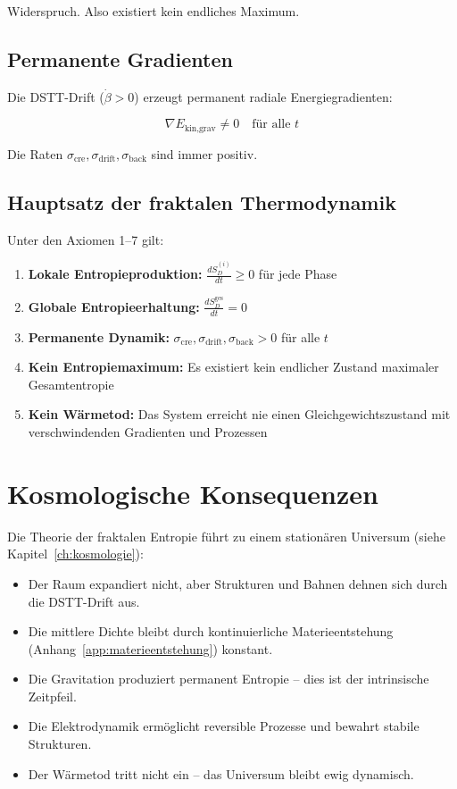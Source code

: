 Widerspruch. Also existiert kein endliches Maximum.

\subsection{Permanente Gradienten}
\label{sub:fraktale_entropie_gradienten}

Die DSTT-Drift (\( \dot{\beta} > 0 \)) erzeugt permanent radiale Energiegradienten:

\[
\nabla E_{\text{kin,grav}} \neq 0 \quad \text{für alle } t \tag{L.18}
\]

Die Raten \( \sigma_{\text{cre}}, \sigma_{\text{drift}}, \sigma_{\text{back}} \) sind immer positiv.

\subsection{Hauptsatz der fraktalen Thermodynamik}
\label{sub:fraktale_entropie_hauptsatz}

Unter den Axiomen 1–7 gilt:

\begin{enumerate}
    \item \textbf{Lokale Entropieproduktion:} \( \displaystyle \frac{dS_D^{(i)}}{dt} \geq 0 \) für jede Phase
    \item \textbf{Globale Entropieerhaltung:} \( \displaystyle \frac{dS_D^{\text{ges}}}{dt} = 0 \)
    \item \textbf{Permanente Dynamik:} \( \sigma_{\text{cre}}, \sigma_{\text{drift}}, \sigma_{\text{back}} > 0 \) für alle \( t \)
    \item \textbf{Kein Entropiemaximum:} Es existiert kein endlicher Zustand maximaler Gesamtentropie
    \item \textbf{Kein Wärmetod:} Das System erreicht nie einen Gleichgewichtszustand mit verschwindenden Gradienten und Prozessen
\end{enumerate}

\section{Kosmologische Konsequenzen}
\label{app:fraktale_entropie_kosmologie}

Die Theorie der fraktalen Entropie führt zu einem stationären Universum (siehe Kapitel~\ref{ch:kosmologie}):

\begin{itemize}
    \item Der Raum expandiert nicht, aber Strukturen und Bahnen dehnen sich durch die DSTT-Drift aus.
    \item Die mittlere Dichte bleibt durch kontinuierliche Materieentstehung (Anhang~\ref{app:materieentstehung}) konstant.
    \item Die Gravitation produziert permanent Entropie – dies ist der intrinsische Zeitpfeil.
    \item Die Elektrodynamik ermöglicht reversible Prozesse und bewahrt stabile Strukturen.
    \item Der Wärmetod tritt nicht ein – das Universum bleibt ewig dynamisch.
\end{itemize}

